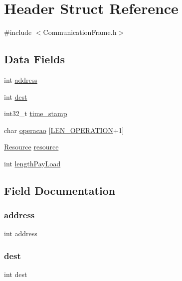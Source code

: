 \hypertarget{struct_header}{}\section{Header Struct Reference}
\label{struct_header}


{\ttfamily \#include $<$Communication\+Frame.\+h$>$}

\subsection*{Data Fields}
\begin{DoxyCompactItemize}
\item 
int \hyperlink{struct_header_a45c6bc6d1135dc398bf8deae861a2ebc}{address}
\item 
int \hyperlink{struct_header_ae5163ff230abd4115d86194ad89467b5}{dest}
\item 
int32\+\_\+t \hyperlink{struct_header_a5cb2d854f1ecd743685db7d52e8806e1}{time\+\_\+stamp}
\item 
char \hyperlink{struct_header_ac8bc9851d68fde59ab31b3bc66fe4967}{operacao} \mbox{[}\hyperlink{_communication_frame_8h_a11b05d589133eb96b765d67e85cebb39}{L\+E\+N\+\_\+\+O\+P\+E\+R\+A\+T\+I\+ON}+1\mbox{]}
\item 
\hyperlink{_cmd_8h_acf246a87e41f47012fc7628989d3fe95}{Resource} \hyperlink{struct_header_a3b11dfb162ae3f6ff66be0063d97a50c}{resource}
\item 
int \hyperlink{struct_header_af60ad441a9839ec90aace2e6c5d4e1cd}{length\+Pay\+Load}
\end{DoxyCompactItemize}


\subsection{Field Documentation}
\mbox{\label{struct_header_a45c6bc6d1135dc398bf8deae861a2ebc}} 
\subsubsection{\texorpdfstring{address}{address}}
{\footnotesize\ttfamily int address}

\mbox{\label{struct_header_ae5163ff230abd4115d86194ad89467b5}} 
\subsubsection{\texorpdfstring{dest}{dest}}
{\footnotesize\ttfamily int dest}

